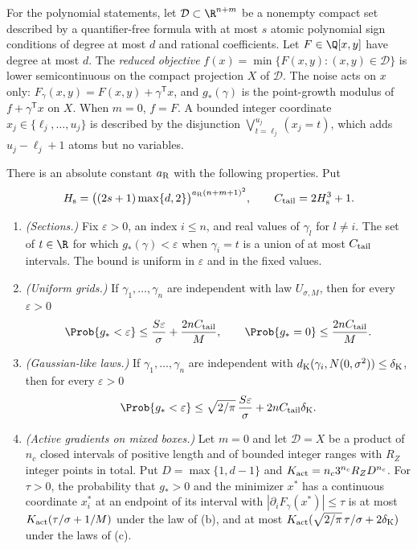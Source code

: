 For the polynomial statements, let $\mathcal D\subset\R^{n+m}$ be a nonempty
compact set described by a quantifier-free formula with at most $s$ atomic
polynomial sign conditions of degree at most $d$ and rational coefficients.
Let $F\in\Q[x,y]$ have degree at most $d$. The \emph{reduced objective}
$f(x)=\min\{F(x,y):(x,y)\in\mathcal D\}$ is lower semicontinuous on the
compact projection $X$ of $\mathcal D$. The noise acts on $x$ only:
$F_\gamma(x,y)=F(x,y)+\gamma^{\mathsf T} x$, and $g_*(\gamma)$ is the point-growth
modulus of $f+\gamma^{\mathsf T} x$ on $X$. When $m=0$, $f=F$. A bounded integer
coordinate $x_j\in\{\ell_j,\dots,u_j\}$ is described by the disjunction
$\bigvee_{t=\ell_j}^{u_j}(x_j=t)$, which adds $u_j-\ell_j+1$ atoms but no
variables.

\begin{lemma}\label{lem:count:finite-tails}
There is an absolute constant $a_{\rm R}$ with the following properties. Put
\[
 H_{\rm s}=\bigl((2s+1)\max\{d,2\}\bigr)^{a_{\rm R}(n+m+1)^2},
 \qquad
 C_{\rm tail}=2H_{\rm s}^3+1 .
\]
\begin{enumerate}[label=(\alph*)]
\item \emph{(Sections.)} Fix $\varepsilon>0$, an index $i\le n$, and real
 values of $\gamma_l$ for $l\ne i$. The set of $t\in\R$ for which
 $g_*(\gamma)<\varepsilon$ when $\gamma_i=t$ is a union of at most
 $C_{\rm tail}$ intervals. The bound is uniform in $\varepsilon$ and in the
 fixed values.
\item \emph{(Uniform grids.)} If $\gamma_1,\dots,\gamma_n$ are independent
 with law $U_{\sigma,M}$, then for every $\varepsilon>0$
 \[
  \Prob\{g_*<\varepsilon\}\le\frac{S\varepsilon}{\sigma}+\frac{2nC_{\rm tail}}M,
  \qquad
  \Prob\{g_*=0\}\le\frac{2nC_{\rm tail}}M .
 \]
\item \emph{(Gaussian-like laws.)} If $\gamma_1,\dots,\gamma_n$ are
 independent with $d_{\rm K}(\gamma_i,N(0,\sigma^2))\le\delta_{\rm K}$, then
 for every $\varepsilon>0$
 \[
  \Prob\{g_*<\varepsilon\}\le\sqrt{2/\pi}\,\frac{S\varepsilon}{\sigma}
  +2nC_{\rm tail}\delta_{\rm K}.
 \]
\item \emph{(Active gradients on mixed boxes.)} Let $m=0$ and let
 $\mathcal D=X$ be a product of $n_c$ closed intervals of positive length
 and of bounded integer ranges with $R_Z$ integer points in total. Put
 $D=\max\{1,d-1\}$ and $K_{\rm act}=n_c3^{n_c}R_ZD^{n_c}$. For $\tau>0$, the
 probability that $g_*>0$ and the minimizer $x^*$ has a continuous
 coordinate $x_i^*$ at an endpoint of its interval with
 $|\partial_iF_\gamma(x^*)|\le\tau$ is at most
 $K_{\rm act}(\tau/\sigma+1/M)$ under the law of (b), and at most
 $K_{\rm act}(\sqrt{2/\pi}\,\tau/\sigma+2\delta_{\rm K})$ under the laws
 of (c).
\end{enumerate}
\end{lemma}

